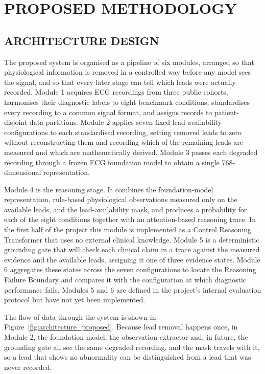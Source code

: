 \chapter{PROPOSED METHODOLOGY}

\section{ARCHITECTURE DESIGN}
The proposed system is organised as a pipeline of six modules, arranged so that physiological information is removed in a controlled way before any model sees the signal, and so that every later stage can tell which leads were actually recorded. Module 1 acquires ECG recordings from three public cohorts, harmonises their diagnostic labels to eight benchmark conditions, standardises every recording to a common signal format, and assigns records to patient-disjoint data partitions. Module 2 applies seven fixed lead-availability configurations to each standardised recording, setting removed leads to zero without reconstructing them and recording which of the remaining leads are measured and which are mathematically derived. Module 3 passes each degraded recording through a frozen ECG foundation model to obtain a single 768-dimensional representation.

Module 4 is the reasoning stage. It combines the foundation-model representation, rule-based physiological observations measured only on the available leads, and the lead-availability mask, and produces a probability for each of the eight conditions together with an attention-based reasoning trace. In the first half of the project this module is implemented as a Control Reasoning Transformer that uses no external clinical knowledge. Module 5 is a deterministic grounding gate that will check each clinical claim in a trace against the measured evidence and the available leads, assigning it one of three evidence states. Module 6 aggregates these states across the seven configurations to locate the Reasoning Failure Boundary and compares it with the configuration at which diagnostic performance fails. Modules 5 and 6 are defined in the project's internal evaluation protocol but have not yet been implemented.

The flow of data through the system is shown in Figure~\ref{fig:architecture_proposed}. Because lead removal happens once, in Module 2, the foundation model, the observation extractor and, in future, the grounding gate all see the same degraded recording, and the mask travels with it, so a lead that shows no abnormality can be distinguished from a lead that was never recorded.

